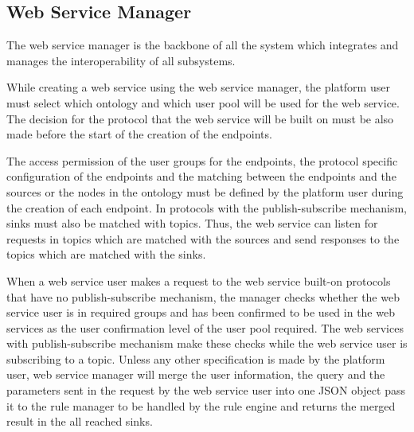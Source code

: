 \subsection{Web Service Manager}

The web service manager is the backbone of all the system which integrates and manages the interoperability of all subsystems.  

While creating a web service using the web service manager, the platform user must select which ontology and which user pool will be used for the web service. The decision for the protocol that the web service will be built on must be also made before the start of the creation of the endpoints. 

The access permission of the user groups for the endpoints, the protocol specific configuration of the endpoints and the matching between the endpoints and the sources or the nodes in the ontology must be defined by the platform user during the creation of each endpoint. In protocols with the publish-subscribe mechanism, sinks must also be matched with topics. Thus, the web service can listen for requests in topics which are matched with the sources and send responses to the topics which are matched with the sinks.

When a web service user makes a request to the web service built-on protocols that have no publish-subscribe mechanism, the manager checks whether the web service user is in required groups and has been confirmed to be used in the web services as the user confirmation level of the user pool required. The web services with publish-subscribe mechanism make these checks while the web service user is subscribing to a topic. Unless any other specification is made by the platform user, web service manager will merge the user information, the query and the parameters sent in the request by the web service user into one JSON object pass it to the rule manager to be handled by the rule engine and returns the merged result in the all reached sinks. 
